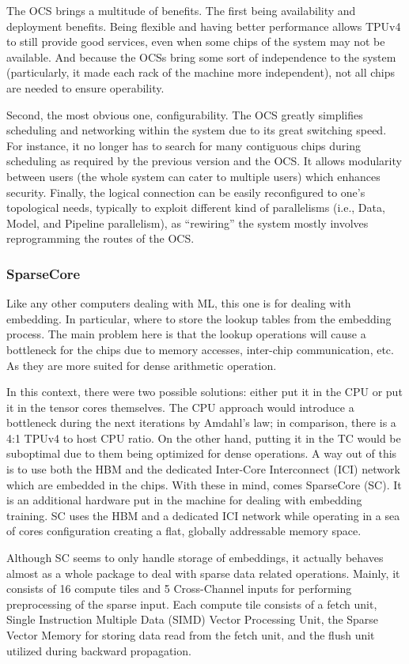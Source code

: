 The OCS brings a multitude of benefits.
The first being availability and deployment benefits.
Being flexible and having better performance allows TPUv4 to still provide good services, even when some chips of the system may not be available.
And because the OCSs bring some sort of independence to the system (particularly, it made each rack of the machine more independent), not all chips are needed to ensure operability.

Second, the most obvious one, configurability.
The OCS greatly simplifies scheduling and networking within the system due to its great switching speed.
For instance, it no longer has to search for many contiguous chips during scheduling as required by the previous version and the OCS. It allows modularity between users (the whole system can cater to multiple users) which enhances security.
Finally, the logical connection can be easily reconfigured to one's topological needs, typically to exploit different kind of parallelisms (i.e., Data, Model, and Pipeline parallelism), as ``rewiring'' the system mostly involves reprogramming the routes of the OCS\@.

\subsubsection{SparseCore}
Like any other computers dealing with ML, this one is for dealing with embedding.
In particular, where to store the lookup tables from the embedding process.
The main problem here is that the lookup operations will cause a bottleneck for the chips due to memory accesses, inter-chip communication, etc.
As they are more suited for dense arithmetic operation.

In this context, there were two possible solutions: either put it in the CPU or put it in the tensor cores themselves.
The CPU approach would introduce a bottleneck during the next iterations by Amdahl’s law; in comparison, there is a 4:1 TPUv4 to host CPU ratio.
On the other hand, putting it in the TC would be suboptimal due to them being optimized for dense operations.
A way out of this is to use both the HBM and the dedicated Inter-Core Interconnect (ICI) network which are embedded in the chips.
With these in mind, comes SparseCore (SC).
It is an additional hardware put in the machine for dealing with embedding training.
SC uses the HBM and a dedicated ICI network while operating in a sea of cores configuration creating a flat, globally addressable memory space.

Although SC seems to only handle storage of embeddings, it actually behaves almost as a whole package to deal with sparse data related operations.
Mainly, it consists of 16 compute tiles and 5 Cross-Channel inputs for performing preprocessing of the sparse input.
Each compute tile consists of a fetch unit, Single Instruction Multiple Data (SIMD) Vector Processing Unit, the Sparse Vector Memory for storing data read from the fetch unit, and the flush unit utilized during backward propagation.

